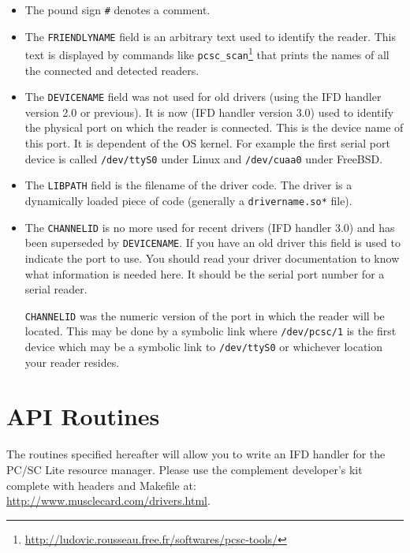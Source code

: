 \documentclass[a4paper,12pt]{article}
\begin{document}
\begin{itemize}
\item The pound sign \verb+#+ denotes a comment.

\item The \texttt{FRIENDLYNAME} field is an arbitrary text used to
identify the reader. This text is displayed by commands like
\texttt{pcsc\_scan}\footnote{\url{http://ludovic.rousseau.free.fr/softwares/pcsc-tools/}}
that prints the names of all the connected and detected readers.

\item The \texttt{DEVICENAME} field was not used for old drivers (using
the IFD handler version 2.0 or previous). It is now (IFD handler version
3.0) used to identify the physical port on which the reader is
connected. This is the device name of this port. It is dependent of the
OS kernel. For example the first serial port device is called
\texttt{/dev/ttyS0} under Linux and \texttt{/dev/cuaa0} under FreeBSD.

\item The \texttt{LIBPATH} field is the filename of the driver code. The
driver is a dynamically loaded piece of code (generally a
\texttt{drivername.so*} file).

\item The \texttt{CHANNELID} is no more used for recent drivers (IFD
handler 3.0) and has been superseded by \texttt{DEVICENAME}. If you
have an old driver this field is used to indicate the port to use. You
should read your driver documentation to know what information is needed
here. It should be the serial port number for a serial reader.

\texttt{CHANNELID} was the numeric version of the port in which the
reader will be located. This may be done by a symbolic link where
\texttt{/dev/pcsc/1} is the first device which may be a symbolic link to
\texttt{/dev/ttyS0} or whichever location your reader resides.

\end{itemize}


\section{API Routines}

The routines specified hereafter will allow you to write an IFD handler
for the PC/SC Lite resource manager. Please use the complement
developer's kit complete with headers and Makefile at:
\url{http://www.musclecard.com/drivers.html}.
\end{document}
